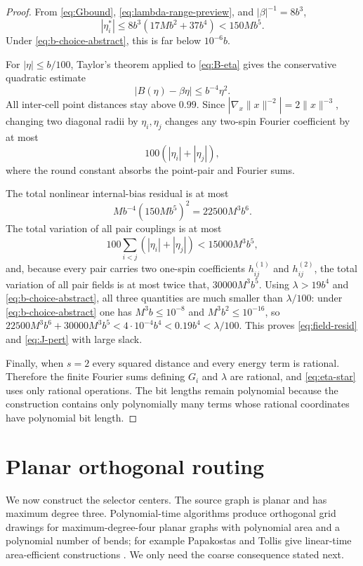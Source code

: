 \documentclass[12pt,a4paper]{article}
\newcommand{\norm}[1]{\lVert #1\rVert}
\begin{document}
\begin{proof}
From \eqref{eq:Gbound}, \eqref{eq:lambda-range-preview}, and $|\beta|^{-1}=8b^3$,
\[
 |\eta_i^*|
 \le8b^3(17Mb^2+37b^4)
 <150Mb^5.
\]
Under \eqref{eq:b-choice-abstract}, this is far below $10^{-6}b$.

For $|\eta|\le b/100$, Taylor's theorem applied to \eqref{eq:B-eta} gives the conservative quadratic estimate
\begin{equation}\label{eq:Bquad}
 |B(\eta)-\beta\eta|\le b^{-4}\eta^2.
\end{equation}
All inter-cell point distances stay above $0.99$.  Since $|\nabla_x\norm{x}^{-2}|=2\norm{x}^{-3}$, changing two diagonal radii by $\eta_i,\eta_j$ changes any two-spin Fourier coefficient by at most
\begin{equation}\label{eq:Lipschitz}
 100(|\eta_i|+|\eta_j|),
\end{equation}
where the round constant absorbs the point-pair and Fourier sums.

The total nonlinear internal-bias residual is at most
\[
 M b^{-4}(150Mb^5)^2=22500M^3b^6.
\]
The total variation of all pair couplings is at most
\[
 100\sum_{i<j}(|\eta_i|+|\eta_j|)
 <15000M^3b^5,
\]
and, because every pair carries two one-spin coefficients $h^{(1)}_{ij}$ and $h^{(2)}_{ij}$, the total variation of all pair fields is at most twice that, $30000M^3b^5$.  Using $\lambda>19b^4$ and \eqref{eq:b-choice-abstract}, all three quantities are much smaller than $\lambda/100$: under \eqref{eq:b-choice-abstract} one has $M^3b\le10^{-8}$ and $M^3b^2\le10^{-16}$, so $22500M^3b^6+30000M^3b^5<4\cdot10^{-4}b^4<0.19b^4<\lambda/100$.  This proves \eqref{eq:field-resid} and \eqref{eq:J-pert} with large slack.

Finally, when $s=2$ every squared distance and every energy term is rational.  Therefore the finite Fourier sums defining $G_i$ and $\lambda$ are rational, and \eqref{eq:eta-star} uses only rational operations.  The bit lengths remain polynomial because the construction contains only polynomially many terms whose rational coordinates have polynomial bit length.
\end{proof}

\section{Planar orthogonal routing}\label{sec:routing}

We now construct the selector centers.  The source graph is planar and has maximum degree three.  Polynomial-time algorithms produce orthogonal grid drawings for maximum-degree-four planar graphs with polynomial area and a polynomial number of bends; for example Papakostas and Tollis give linear-time area-efficient constructions \cite{PapakostasTollis1998}.  We only need the coarse consequence stated next.
\end{document}
